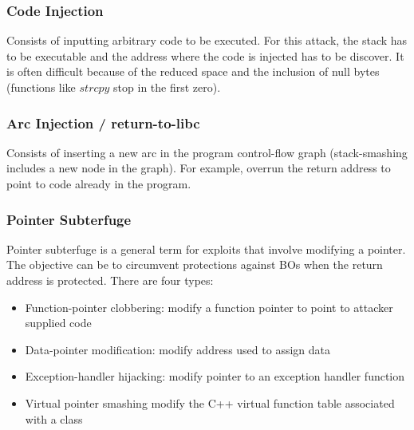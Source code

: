 \documentclass[10pt,a4paper]{report}
\begin{document}
\subsubsection{Code Injection}
Consists of inputting arbitrary code to be executed. For this attack, the stack has to be executable and the address where the code is injected has to be discover. It is often difficult because of the reduced space and the inclusion of null bytes (functions like $strcpy$ stop in the first zero).
\subsubsection{Arc Injection / return-to-libc}
Consists of inserting a new arc in the program control-flow graph (stack-smashing includes a new node in the graph). For example, overrun the return address to point to code already in the program.
\subsubsection{Pointer Subterfuge}
Pointer subterfuge is a general term for exploits that involve modifying a pointer. The objective can be to circumvent protections against BOs when the return address is protected. There are four types:
\begin{itemize}
\item Function-pointer clobbering: modify a function pointer to point to attacker supplied code
\item Data-pointer modification: modify address used to assign data
\item Exception-handler hijacking: modify pointer to an exception handler function
\item Virtual pointer smashing modify the C++ virtual function table associated with a class
\end{itemize}
\end{document}

